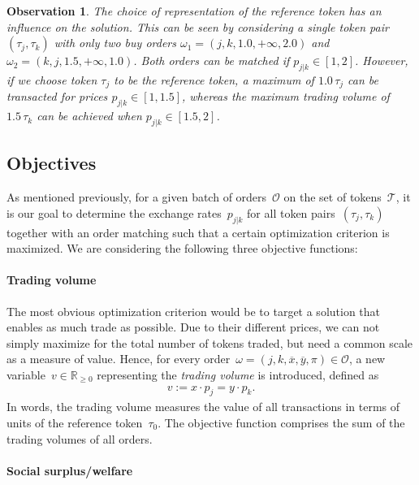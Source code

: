 \documentclass[11pt,parskip=full]{scrartcl}%
\newcommand*{\orders}{\mathcal{O}}          %
\newtheorem{observation}[theorem]{Observation}
\begin{document}
\vspace{.2cm}
\begin{observation}
The choice of representation of the reference token has an influence on the solution.
This can be seen by considering a single token pair $ (\tau_j,\tau_k) $ with only two buy orders
$ \omega_1 = (j,k,1.0,+\infty,2.0) $ and $ \omega_2 = (k,j,1.5,+\infty,1.0) $.
Both orders can be matched if $ p_{j|k} \in [1,2] $.
However, if we choose token $ \tau_j $ to be the reference token, a maximum of $ 1.0 \, \tau_j $
can be transacted for prices $ p_{j|k} \in [1,1.5] $, whereas the maximum trading volume of
$ 1.5 \, \tau_k $ can be achieved when $ p_{j|k} \in [1.5,2] $.
\end{observation}


\subsection{Objectives}
\label{subsec:objectives}

As mentioned previously, for a given batch of orders~$\mathcal{O}$ on the set of tokens~$\mathcal{T}$, it is our goal to determine the exchange rates~$p_{j|k}$ for all token pairs~$(\tau_j,\tau_k)$ together with an order matching such that a certain optimization criterion is maximized.
We are considering the following three objective functions:

\paragraph{Trading volume}

The most obvious optimization criterion would be to target a solution that enables as much trade as possible.
Due to their different prices, we can not simply maximize for the total number of tokens traded, but need a common scale as a measure of value.
Hence, for every order~$\omega = (j,k,\overline{x},\overline{y},\pi) \in \orders$, a new variable~$v \in \mathbb{R}_{\ge 0}$ representing the \emph{trading volume} is introduced, defined as
\begin{align}
  v := x \cdot p_j = y \cdot p_k.
  \label{eq:volume}
\end{align}
In words, the trading volume measures the value of all transactions in terms of units of the reference token~$\tau_0$.
The objective function comprises the sum of the trading volumes of all orders.

\paragraph{Social surplus/welfare}
\end{document}
